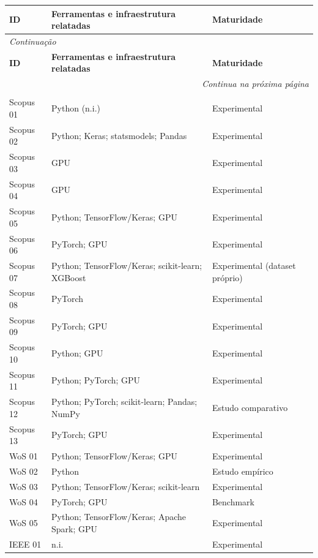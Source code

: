 {\footnotesize
\setlength{\tabcolsep}{3pt}
\renewcommand{\arraystretch}{1.15}
\begin{longtable}{p{1.3cm}p{8.8cm}p{4.9cm}}
\toprule
\textbf{ID} & \textbf{Ferramentas e infraestrutura relatadas} & \textbf{Maturidade} \\
\midrule
\endfirsthead
\multicolumn{3}{l}{\textit{Continuação}}\\
\toprule
\textbf{ID} & \textbf{Ferramentas e infraestrutura relatadas} & \textbf{Maturidade} \\
\midrule
\endhead
\midrule
\multicolumn{3}{r}{\textit{Continua na próxima página}}\\
\endfoot
\bottomrule
\multicolumn{3}{l}{Fonte: Elaborado pelo autor (2026).}\\
\endlastfoot
Scopus 01 & Python (n.i.) & Experimental \\
Scopus 02 & Python; Keras; statsmodels; Pandas & Experimental \\
Scopus 03 & GPU & Experimental \\
Scopus 04 & GPU & Experimental \\
Scopus 05 & Python; TensorFlow/Keras; GPU & Experimental \\
Scopus 06 & PyTorch; GPU & Experimental \\
Scopus 07 & Python; TensorFlow/Keras; scikit-learn; XGBoost & Experimental (dataset próprio) \\
Scopus 08 & PyTorch & Experimental \\
Scopus 09 & PyTorch; GPU & Experimental \\
Scopus 10 & Python; GPU & Experimental \\
Scopus 11 & Python; PyTorch; GPU & Experimental \\
Scopus 12 & Python; PyTorch; scikit-learn; Pandas; NumPy & Estudo comparativo \\
Scopus 13 & PyTorch; GPU & Experimental \\
WoS 01 & Python; TensorFlow/Keras; GPU & Experimental \\
WoS 02 & Python & Estudo empírico \\
WoS 03 & Python; TensorFlow/Keras; scikit-learn & Experimental \\
WoS 04 & PyTorch; GPU & Benchmark \\
WoS 05 & Python; TensorFlow/Keras; Apache Spark; GPU & Experimental \\
IEEE 01 & n.i. & Experimental \\

\end{longtable}}
